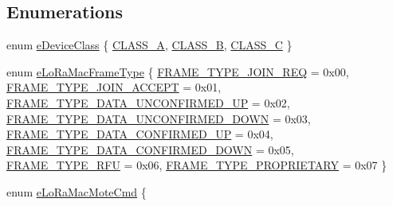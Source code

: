\subsection*{Enumerations}
\begin{DoxyCompactItemize}
\item 
enum \hyperlink{group__LORAMAC_ga133e92597739340bac439d1b0916dcb6}{e\+Device\+Class} \{ \hyperlink{group__LORAMAC_gga133e92597739340bac439d1b0916dcb6a307ee33f71385819abc142fe4f23c3bb}{C\+L\+A\+S\+S\+\_\+A}, 
\hyperlink{group__LORAMAC_gga133e92597739340bac439d1b0916dcb6a10611f4c3b970c7d722c98eaea63ddd5}{C\+L\+A\+S\+S\+\_\+B}, 
\hyperlink{group__LORAMAC_gga133e92597739340bac439d1b0916dcb6abfee35359a39adbacbc3f13eddc76cd0}{C\+L\+A\+S\+S\+\_\+C}
 \}
\item 
enum \hyperlink{group__LORAMAC_ga5e02f214e1a4b8578c415045367c0a11}{e\+Lo\+Ra\+Mac\+Frame\+Type} \{ \newline
\hyperlink{group__LORAMAC_gga5e02f214e1a4b8578c415045367c0a11ae01d60e50804065d3564dc1e12d80811}{F\+R\+A\+M\+E\+\_\+\+T\+Y\+P\+E\+\_\+\+J\+O\+I\+N\+\_\+\+R\+EQ} = 0x00, 
\hyperlink{group__LORAMAC_gga5e02f214e1a4b8578c415045367c0a11a47ee6b14ec9dfe5ae33773749c30c103}{F\+R\+A\+M\+E\+\_\+\+T\+Y\+P\+E\+\_\+\+J\+O\+I\+N\+\_\+\+A\+C\+C\+E\+PT} = 0x01, 
\hyperlink{group__LORAMAC_gga5e02f214e1a4b8578c415045367c0a11a6701b29296dc0a006f52d51f510a138f}{F\+R\+A\+M\+E\+\_\+\+T\+Y\+P\+E\+\_\+\+D\+A\+T\+A\+\_\+\+U\+N\+C\+O\+N\+F\+I\+R\+M\+E\+D\+\_\+\+UP} = 0x02, 
\hyperlink{group__LORAMAC_gga5e02f214e1a4b8578c415045367c0a11a0309638c699fe7748561e2bac00bd689}{F\+R\+A\+M\+E\+\_\+\+T\+Y\+P\+E\+\_\+\+D\+A\+T\+A\+\_\+\+U\+N\+C\+O\+N\+F\+I\+R\+M\+E\+D\+\_\+\+D\+O\+WN} = 0x03, 
\newline
\hyperlink{group__LORAMAC_gga5e02f214e1a4b8578c415045367c0a11ac64f43487ee770c216c2ee1a829b75ca}{F\+R\+A\+M\+E\+\_\+\+T\+Y\+P\+E\+\_\+\+D\+A\+T\+A\+\_\+\+C\+O\+N\+F\+I\+R\+M\+E\+D\+\_\+\+UP} = 0x04, 
\hyperlink{group__LORAMAC_gga5e02f214e1a4b8578c415045367c0a11ad9249e47768f5551f2733532da9f3712}{F\+R\+A\+M\+E\+\_\+\+T\+Y\+P\+E\+\_\+\+D\+A\+T\+A\+\_\+\+C\+O\+N\+F\+I\+R\+M\+E\+D\+\_\+\+D\+O\+WN} = 0x05, 
\hyperlink{group__LORAMAC_gga5e02f214e1a4b8578c415045367c0a11a161e7c522a6d16fc5d3efb813f2f1351}{F\+R\+A\+M\+E\+\_\+\+T\+Y\+P\+E\+\_\+\+R\+FU} = 0x06, 
\hyperlink{group__LORAMAC_gga5e02f214e1a4b8578c415045367c0a11a68dbf0499a1912728cc6a6d1ab328b37}{F\+R\+A\+M\+E\+\_\+\+T\+Y\+P\+E\+\_\+\+P\+R\+O\+P\+R\+I\+E\+T\+A\+RY} = 0x07
 \}
\item 
enum \hyperlink{group__LORAMAC_gaa56523d6cd76c438d6bc4263b5254d73}{e\+Lo\+Ra\+Mac\+Mote\+Cmd} \{ \newline

\end{DoxyCompactItemize}
